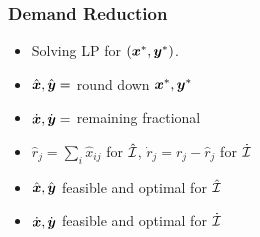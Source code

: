 \documentclass[handout, hyperref, dvipsnames]{beamer}
\begin{document}
\begin{frame}
  \frametitle{Demand Reduction}

  \begin{itemize}
  \item Solving LP for $(\boldsymbol{x}^\ast, \boldsymbol{y}^\ast)$.
  \item $\hat{\boldsymbol{x}}, \hat{\boldsymbol{y}} = $ round down $\boldsymbol{x}^\ast, \boldsymbol{y}^\ast$
  \item $\dot{\boldsymbol{x}}, \dot{\boldsymbol{y}} = $ remaining fractional
  \item $\hat r_j = \sum_{i}\hat x_{ij}$ for $\hat{\mathcal{I}}$, $\dot r_j = r_j - \hat r_j$ for $\dot{\mathcal{I}}$
  \item $\hat{\boldsymbol{x}}, \hat{\boldsymbol{y}}$ feasible and optimal for $\hat{\mathcal{I}}$
  \item $\dot{\boldsymbol{x}}, \dot{\boldsymbol{y}}$ feasible and optimal for $\dot{\mathcal{I}}$
  \end{itemize}
\end{frame}
\end{document}

